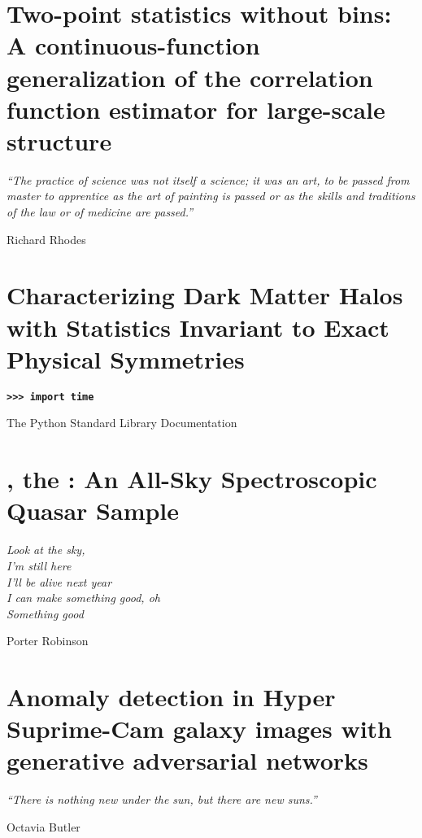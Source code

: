 \documentclass[12pt,oneside,letterpaper]{report}
\begin{document}
\chapter{Two-point statistics without bins: A continuous-function generalization of the correlation function estimator for large-scale structure}
\setcounter{section}{-1}
\label{chp:cfe}
\epigraph{\emph{``The practice of science was not itself a science; it was an art, to be passed from master to apprentice as the art of painting is passed or as the skills and traditions of the law or of medicine are passed.''}}{\vspace{1em}{\emdash}Richard Rhodes}


\chapter{Characterizing Dark Matter Halos with Statistics Invariant to Exact Physical Symmetries}
\setcounter{section}{-1}
\label{chp:eqcosmo}
\setlength{\epigraphwidth}{3in}
\epigraph{\textbf{\texttt{>>> import time}}}{\vspace{1em}{\emdash}The Python Standard Library Documentation}
\setlength{\epigraphwidth}{3in}


\chapter{\cat, the \Catalog: An All-Sky Spectroscopic Quasar Sample}
\setcounter{section}{-1}
\label{chp:quaia}
\setlength{\epigraphwidth}{2.5in}
\epigraph{\emph{Look at the sky,\\ 
I'm still here\\
I'll be alive next year\\
I can make something good, oh\\
Something good}}{\vspace{1em}{\emdash}Porter Robinson}
\setlength{\epigraphwidth}{4in}


\chapter{Anomaly detection in Hyper Suprime-Cam galaxy images with generative adversarial networks}
\setcounter{section}{-1}
\label{chp:anomalies}
\epigraph{\emph{``There is nothing new under the sun, but there are new suns.''}}{\vspace{1em}{\emdash}Octavia Butler}

\end{document}
